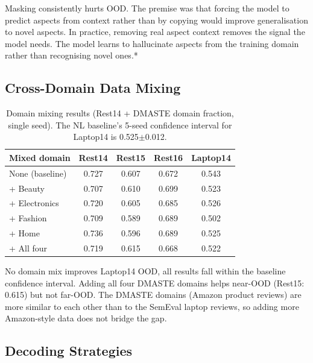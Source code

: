 \documentclass[12pt,a4paper]{report}
\begin{document}
Masking consistently hurts OOD. The premise was that forcing the model to predict aspects from context rather than by copying would improve generalisation to novel aspects. In practice, removing real aspect context removes the signal the model needs. The model learns to hallucinate aspects from the training domain rather than recognising novel ones.*

\subsection{Cross-Domain Data Mixing}

\begin{table}[H]
\centering
\caption{Domain mixing results (Rest14 + DMASTE domain fraction, single seed). The NL baseline's 5-seed confidence interval for Laptop14 is 0.525$\pm$0.012.}
\label{tab:domainmix}
\small
\begin{tabular}{@{}lcccc@{}}
\toprule
\textbf{Mixed domain} & \textbf{Rest14} & \textbf{Rest15} & \textbf{Rest16} & \textbf{Laptop14} \\
\midrule
None (baseline) & 0.727 & 0.607 & 0.672 & 0.543 \\
\midrule
+ Beauty & 0.707 & 0.610 & 0.699 & 0.523 \\
+ Electronics & 0.720 & 0.605 & 0.685 & 0.526 \\
+ Fashion & 0.709 & 0.589 & 0.689 & 0.502 \\
+ Home & 0.736 & 0.596 & 0.689 & 0.525 \\
+ All four & 0.719 & 0.615 & 0.668 & 0.522 \\
\bottomrule
\end{tabular}
\end{table}

No domain mix improves Laptop14 OOD, all results fall within the baseline confidence interval. Adding all four DMASTE domains helps near-OOD (Rest15: 0.615) but not far-OOD. The DMASTE domains (Amazon product reviews) are more similar to each other than to the SemEval laptop reviews, so adding more Amazon-style data does not bridge the gap.

\subsection{Decoding Strategies}
\end{document}
